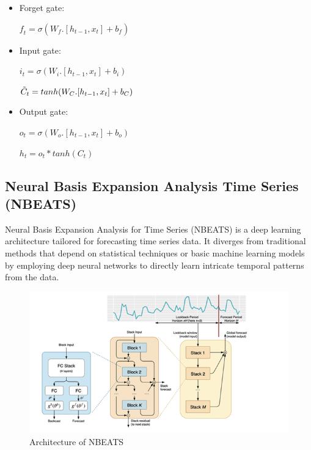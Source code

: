 \documentclass{ieeeojies}
\begin{document}
\begin{itemize}
	\item  Forget gate: 
	\newline \centerline{$\textit{f}_{t} = \sigma (\textit{W}_{\textit{f}}.[h_{t-1},x_{t}] + b_{\textit{f}})$}
	\item Input gate: 
	\newline \centerline{$i_{t} = \sigma(\textit{W}_{i}.[h_{t-1},x_{t}]+b_{i})$}
	\newline \centerline{$\Tilde{C}_{t} = tanh(W_{C}.[h_{t-1},x_{t}] + b_{C})$}
	\item Output gate:
	\newline \centerline{$o_{t} = \sigma(W_{o}.[h_{t-1},x_{t}] + b_{o})$}
	\newline \centerline{$h_{t} = o_{t} * tanh(C_{t})$}
\end{itemize}

\subsection{Neural Basis Expansion Analysis Time Series (NBEATS)}
Neural Basis Expansion Analysis for Time Series (NBEATS) is a deep learning architecture tailored for forecasting time series data. It diverges from traditional methods that depend on statistical techniques or basic machine learning models by employing deep neural networks to directly learn intricate temporal patterns from the data.
\begin{figure}[H]
	\centering
	\begin{minipage}{0.25\textwidth}
		\centering
		\includegraphics[width=1\textwidth]{bibliography/Images/NBEATS_Img1.png}
		\caption{Architecture of NBEATS}
		\label{fig:1}
	\end{minipage}
\end{figure}
\end{document}
